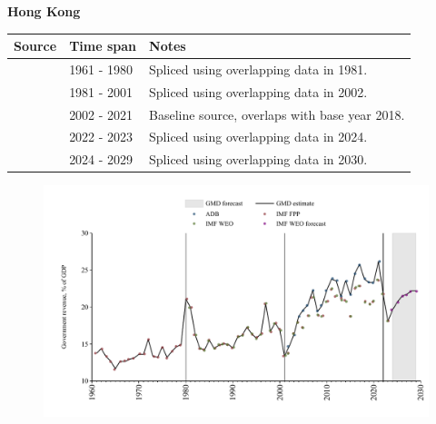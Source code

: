 \documentclass[12pt,a4paper,landscape]{article}
\begin{document}
\begin{adjustbox}{max totalsize={\paperwidth}{\paperheight},center}
\begin{minipage}[t][\textheight][t]{\textwidth}
\vspace*{0.5cm}
{}
\begin{center}
{\Large\bfseries Hong Kong}
\end{center}
\vspace{0.5cm}
\begin{table}[H]
\centering
\small
\begin{tabular}{|l|l|l|}
\hline
\textbf{Source} & \textbf{Time span} & \textbf{Notes} \\
\hline
\rowcolor{white}\cite{IMF_FPP}& 1961 - 1980 &Spliced using overlapping data in 1981.\\
\rowcolor{lightgray}\cite{IMF_WEO}& 1981 - 2001 &Spliced using overlapping data in 2002.\\
\rowcolor{white}\cite{ADB}& 2002 - 2021 &Baseline source, overlaps with base year 2018.\\
\rowcolor{lightgray}\cite{IMF_WEO}& 2022 - 2023 &Spliced using overlapping data in 2024.\\
\rowcolor{white}\cite{IMF_WEO_forecast}& 2024 - 2029 &Spliced using overlapping data in 2030.\\
\hline
\end{tabular}
\end{table}
\begin{figure}[H]
\centering
\includegraphics[width=\textwidth,height=0.6\textheight,keepaspectratio]{graphs/HKG_govrev_GDP.pdf}
\end{figure}
\end{minipage}
\end{adjustbox}
\end{document}

